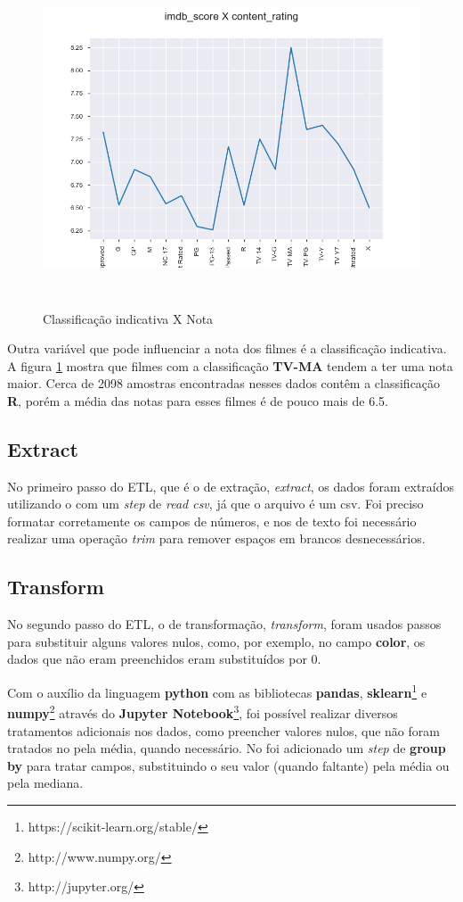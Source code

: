 \begin{figure}[H]
\centering
\includegraphics[height=10cm]{imagens/scoreXcontent.png}
\caption{Classificação indicativa X Nota}
\label{ratingXscore}
\end{figure}
Outra variável que pode influenciar a nota dos filmes é a classificação indicativa. A figura \ref{ratingXscore} mostra que filmes com a classificação \textbf{TV-MA} tendem a ter uma nota maior. Cerca de 2098 amostras encontradas nesses dados contêm a classificação \textbf{R}, porém a média das notas para esses filmes é de pouco mais de 6.5.

\subsection{Extract}
No primeiro passo do ETL, que é o de extração, \textit{extract}, os dados foram extraídos utilizando o \pdi com um \textit{step} de \textit{read csv}, já que o arquivo é um csv. Foi preciso formatar corretamente os campos de números, e nos de texto foi necessário realizar uma operação \textit{trim} para remover espaços em brancos desnecessários. 

\subsection{Transform}
No segundo passo do ETL, o de transformação, \textit{transform}, foram usados passos para substituir alguns valores nulos, como, por exemplo, no campo \textbf{color}, os dados que não eram preenchidos eram substituídos por 0. 

Com o auxílio da linguagem \textbf{python} com as bibliotecas \textbf{pandas}, \textbf{sklearn}\footnote{https://scikit-learn.org/stable/} e \textbf{numpy}\footnote{http://www.numpy.org/} através do \textbf{Jupyter Notebook}\footnote{http://jupyter.org/}, foi possível realizar diversos tratamentos adicionais nos dados, como preencher valores nulos, que não foram tratados no \pdi pela média, quando necessário. No \pdi foi adicionado um \textit{step} de \textbf{group by} para tratar campos, substituindo o seu valor (quando faltante) pela média ou pela mediana. 


